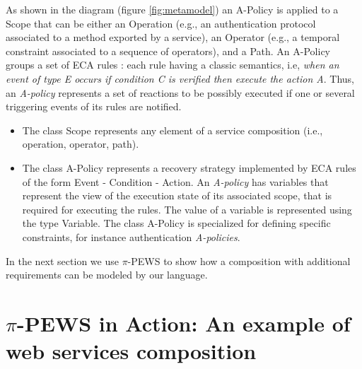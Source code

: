 \documentclass{sig-alternate}
\begin{document}
As shown in the diagram (figure \ref{fig:metamodel}) an {\sc A-Policy} is
applied to a {\sc Scope} that can be either an {\sc Operation} (e.g., an authentication protocol associated to a
method exported by a service), an {\sc Operator} (e.g., a temporal constraint
associated to a sequence of operators), and
a {\sc Path}. An {\sc A-Policy} groups a set of ECA rules \cite{PortillaHE08}:
each rule having a classic semantics, i.e, {\em when an event of type E occurs if  condition C is
verified then execute the action A}.  Thus, an {\em A-policy} represents a set
of reactions to be possibly executed if one or several triggering events of its
rules are notified.
\begin{itemize}
\item The class {\sc Scope} represents any element of a service composition
(i.e., operation, operator, path).
\item The class {\sc A-Policy} represents a recovery strategy implemented by ECA
rules of the form {\sc Event} - {\sc Condition} - {\sc Action}. An {\em
A-policy} has variables that represent the view of the execution state of its associated
scope, that is required for executing the rules. The value of a variable is
represented using the type {\sc Variable}. The class {\sc A-Policy} is
specialized for defining specific constraints, for instance authentication {\em
A-policies}.
\end{itemize}


In the next section we use $\pi$-PEWS to show how a composition with additional
requirements can be modeled by our language.

\section{$\pi$-PEWS in Action: An example of web services composition} \label{sec:example}
 
\end{document}
